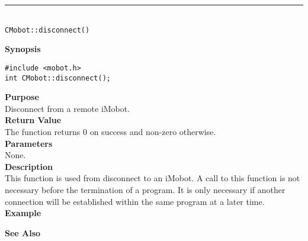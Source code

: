 \noindent
\vspace{5pt}
\rule{4.5in}{0.015in}\\
\noindent
{\LARGE \texttt{CMobot::disconnect()}}\\
{}

\noindent
{\bf Synopsis}\\
\begin{verbatim}
#include <mobot.h>
int CMobot::disconnect();
\end{verbatim}

\noindent
{\bf Purpose}\\
Disconnect from a remote iMobot.\\

\noindent
{\bf Return Value}\\
The function returns 0 on success and non-zero otherwise.\\

\noindent
{\bf Parameters}\\
None.\\

\noindent
{\bf Description}\\
This function is used from disconnect to an iMobot. A call to this function is
not necessary before the termination of a program. It is only necessary if
another connection will be established within the same program at a later time.
\\

\noindent
{\bf Example}\\
\noindent

\noindent
{\bf See Also}\\

